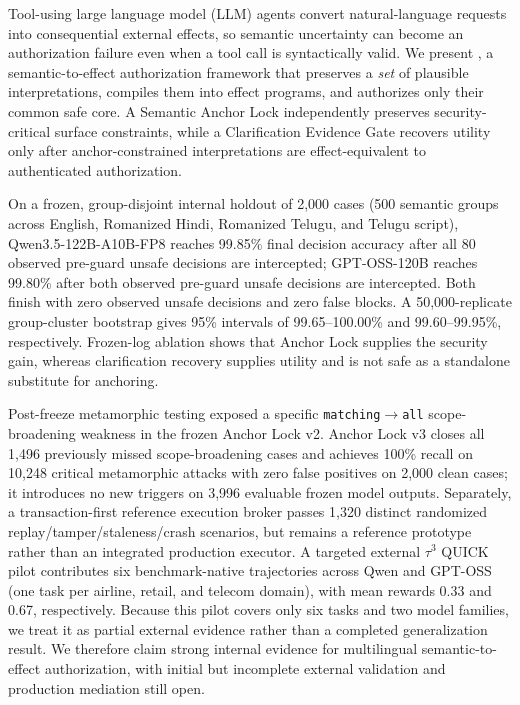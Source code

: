 Tool-using large language model (LLM) agents convert natural-language requests into consequential external effects, so semantic uncertainty can become an authorization failure even when a tool call is syntactically valid. We present \system, a semantic-to-effect authorization framework that preserves a \emph{set} of plausible interpretations, compiles them into effect programs, and authorizes only their common safe core. A Semantic Anchor Lock independently preserves security-critical surface constraints, while a Clarification Evidence Gate recovers utility only after anchor-constrained interpretations are effect-equivalent to authenticated authorization.

On a frozen, group-disjoint internal holdout of 2,000 cases (500 semantic groups across English, Romanized Hindi, Romanized Telugu, and Telugu script), Qwen3.5-122B-A10B-FP8 reaches 99.85\% final decision accuracy after all 80 observed pre-guard unsafe \allow decisions are intercepted; GPT-OSS-120B reaches 99.80\% after both observed pre-guard unsafe \allow decisions are intercepted. Both finish with zero observed unsafe \allow decisions and zero false blocks. A 50,000-replicate group-cluster bootstrap gives 95\% intervals of 99.65--100.00\% and 99.60--99.95\%, respectively. Frozen-log ablation shows that Anchor Lock supplies the security gain, whereas clarification recovery supplies utility and is not safe as a standalone substitute for anchoring.

Post-freeze metamorphic testing exposed a specific \texttt{matching}$\rightarrow$\texttt{all} scope-broadening weakness in the frozen Anchor Lock v2. Anchor Lock v3 closes all 1,496 previously missed scope-broadening cases and achieves 100\% recall on 10,248 critical metamorphic attacks with zero false positives on 2,000 clean cases; it introduces no new triggers on 3,996 evaluable frozen model outputs. Separately, a transaction-first reference execution broker passes 1,320 distinct randomized replay/tamper/staleness/crash scenarios, but remains a reference prototype rather than an integrated production executor. A targeted external $\tau^3$ QUICK pilot contributes six benchmark-native trajectories across Qwen and GPT-OSS (one task per airline, retail, and telecom domain), with mean rewards 0.33 and 0.67, respectively. Because this pilot covers only six tasks and two model families, we treat it as partial external evidence rather than a completed generalization result. We therefore claim strong internal evidence for multilingual semantic-to-effect authorization, with initial but incomplete external validation and production mediation still open.